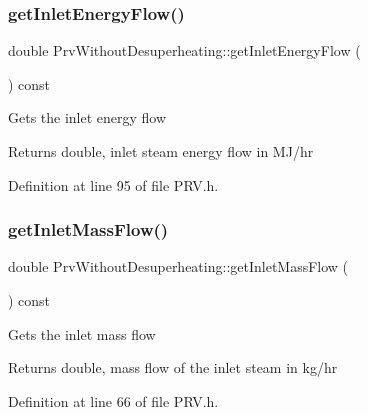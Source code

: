 \subsubsection{\texorpdfstring{get\+Inlet\+Energy\+Flow()}{getInletEnergyFlow()}}
{\footnotesize\ttfamily double Prv\+Without\+Desuperheating\+::get\+Inlet\+Energy\+Flow (\begin{DoxyParamCaption}{ }\end{DoxyParamCaption}) const\hspace{0.3cm}{\ttfamily [inline]}}

Gets the inlet energy flow \begin{DoxyReturn}{Returns}
double, inlet steam energy flow in M\+J/hr 
\end{DoxyReturn}


Definition at line 95 of file P\+R\+V.\+h.

\mbox{\label{class_prv_without_desuperheating_a0ae2ed88cc8bd4e69cddc05ef1225811}} 
\subsubsection{\texorpdfstring{get\+Inlet\+Mass\+Flow()}{getInletMassFlow()}}
{\footnotesize\ttfamily double Prv\+Without\+Desuperheating\+::get\+Inlet\+Mass\+Flow (\begin{DoxyParamCaption}{ }\end{DoxyParamCaption}) const\hspace{0.3cm}{\ttfamily [inline]}}

Gets the inlet mass flow

\begin{DoxyReturn}{Returns}
double, mass flow of the inlet steam in kg/hr 
\end{DoxyReturn}


Definition at line 66 of file P\+R\+V.\+h.

\mbox{\label{class_prv_without_desuperheating_a4b1244b479abfaef01abbb62395dff13}} 
